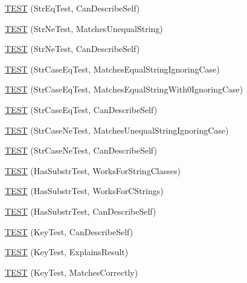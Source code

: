 \begin{DoxyCompactItemize}
\item 
\hyperlink{namespacetesting_1_1gmock__matchers__test_a1cb9d74bdf937816807e91b842b22c75}{T\+E\+ST} (Str\+Eq\+Test, Can\+Describe\+Self)
\item 
\hyperlink{namespacetesting_1_1gmock__matchers__test_a3c0a0ca54e3d34c55bd30c2b5572d902}{T\+E\+ST} (Str\+Ne\+Test, Matches\+Unequal\+String)
\item 
\hyperlink{namespacetesting_1_1gmock__matchers__test_a4daef0c28c6b07cb3d6a6306c05599b0}{T\+E\+ST} (Str\+Ne\+Test, Can\+Describe\+Self)
\item 
\hyperlink{namespacetesting_1_1gmock__matchers__test_ae0c0b82b3895923747dc70cb9339a8dc}{T\+E\+ST} (Str\+Case\+Eq\+Test, Matches\+Equal\+String\+Ignoring\+Case)
\item 
\hyperlink{namespacetesting_1_1gmock__matchers__test_aa159c9a52c6dc18cb7f214fbb5bddece}{T\+E\+ST} (Str\+Case\+Eq\+Test, Matches\+Equal\+String\+With0\+Ignoring\+Case)
\item 
\hyperlink{namespacetesting_1_1gmock__matchers__test_ab4fb6542ea3a7789850668a9266a80ef}{T\+E\+ST} (Str\+Case\+Eq\+Test, Can\+Describe\+Self)
\item 
\hyperlink{namespacetesting_1_1gmock__matchers__test_a9a627f8538cfff62fbaee86ac465f6c8}{T\+E\+ST} (Str\+Case\+Ne\+Test, Matches\+Unequal\+String\+Ignoring\+Case)
\item 
\hyperlink{namespacetesting_1_1gmock__matchers__test_ae953891c7961b6ffd51dc712be8d24de}{T\+E\+ST} (Str\+Case\+Ne\+Test, Can\+Describe\+Self)
\item 
\hyperlink{namespacetesting_1_1gmock__matchers__test_a2a1043a0b8bfb4bc0b5fb539317132a3}{T\+E\+ST} (Has\+Substr\+Test, Works\+For\+String\+Classes)
\item 
\hyperlink{namespacetesting_1_1gmock__matchers__test_a147dde340ba8f77308cd116d3bb831d6}{T\+E\+ST} (Has\+Substr\+Test, Works\+For\+C\+Strings)
\item 
\hyperlink{namespacetesting_1_1gmock__matchers__test_ae47e8ad8f8a4a33ac08b596eb839380e}{T\+E\+ST} (Has\+Substr\+Test, Can\+Describe\+Self)
\item 
\hyperlink{namespacetesting_1_1gmock__matchers__test_acdbdca45a537261fd168cdb8df9348d7}{T\+E\+ST} (Key\+Test, Can\+Describe\+Self)
\item 
\hyperlink{namespacetesting_1_1gmock__matchers__test_a38169c972e14fef59a41e532fb5b431e}{T\+E\+ST} (Key\+Test, Explains\+Result)
\item 
\hyperlink{namespacetesting_1_1gmock__matchers__test_a39f4f76617c414ab715b701eb82eeee4}{T\+E\+ST} (Key\+Test, Matches\+Correctly)

\end{DoxyCompactItemize}
